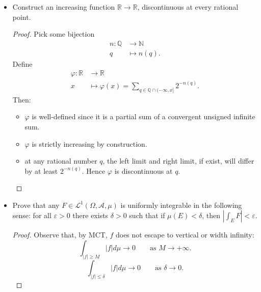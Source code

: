 \begin{itemize}
\begin{proof}
	Fix $\varepsilon>0$. For each $n$, let $\mathcal{F}_n$ be a countable collection of intervals that cover $E$ and with $\sum_{I \in \mathcal{F}_n} |I| < \frac{\varepsilon}{2^n}$. Now consider the union $\mathcal{F} = \bigcup_{n \in \mathbb{N}} \mathcal{F}_n$. $\mathcal{F}$ is countable, with total length $\le 2 \varepsilon$, and for each $x \in E$ and $n \in \mathbb{N}$ there exists $I_n \in \mathcal{F}_n$ that contains $x$. Hence $x$ is contained in infinitely many $I_n$ 's. Now apply the previous parts of the claim.
\end{proof}

\item Construct an increasing function $\mathbb{R}\to  \mathbb{R}$, discontinuous at every rational point.
\begin{proof}
	Pick some bijection
	\begin{align*}
		n: \mathbb{Q} &\longrightarrow \mathbb{N} \\
		q &\longmapsto n(q)
	.\end{align*}
	Define
	\begin{align*}
		\varphi: \mathbb{R} &\longrightarrow \mathbb{R} \\
		x &\longmapsto \varphi(x) = \sum_{q \in \mathbb{Q} \cap (-\infty , x] }2^{-n(q)}
	.\end{align*}
	Then:
	\begin{itemize}
		\item $\varphi$ is well-defined since it is a partial sum of a convergent unsigned infinite sum.
		\item $\varphi$ is strictly increasing by construction.
		\item at any rational number $q$, the left limit and right limit, if exist, will differ by at least $2^{-n(q)}$. Hence $\varphi$ is discontinuous at $q$.
	\end{itemize}

\end{proof}

\item Prove that any $F \in \mathcal{L}^1 (\Omega, \mathcal{A}, \mu)$ is uniformly integrable in the following sense: for all $\varepsilon>0$ there exists $\delta > 0$ such that if $\mu(E) < \delta$, then $\left| \int _E F \right| < \varepsilon$.
\begin{proof}
	Observe that, by MCT, $f$ does not escape to vertical or width infinity:
	\[
		\int _{|f| \ge M} |f| d \mu \to 0 \qquad \text{as } M \to +\infty 
	.\] 
	\[
		\int _{|f| \le \delta}|f| d \mu \to 0 \qquad \text{as } \delta \to 0
	.\] 


\end{proof}
\end{itemize}
